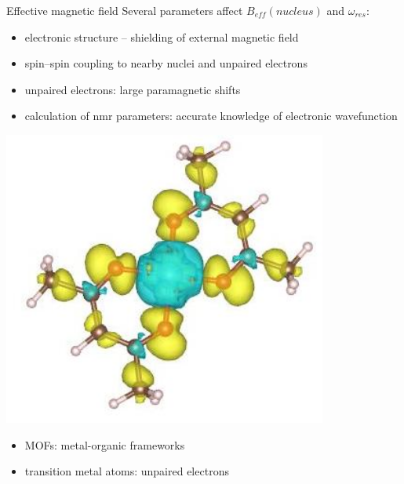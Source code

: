 \documentclass[slovene, usenames,dvipsnames]{beamer}
\begin{document}
\begin{frame}{Effective magnetic field}
  Several parameters affect $B_{eff}(nucleus)$ and $\omega_{res}$: \pause
  \begin{itemize}[]
  \item electronic structure -- shielding of external magnetic field \pause 
  \item spin--spin coupling to nearby nuclei and unpaired electrons \pause
  \item unpaired electrons: large paramagnetic shifts \pause
    \item calculation of nmr parameters: accurate knowledge of electronic wavefunction
   \end{itemize}
 \begin{minipage}[]{0.4\textwidth}
      \centering
    \includegraphics[width=0.8\textwidth]{cuacac_spin_density.png}
 \end{minipage}%
 \begin{minipage}[]{0.6\textwidth}
   \centering
    \begin{itemize}[]
    \item MOFs: metal-organic frameworks \pause
    \item transition metal atoms: unpaired electrons \pause
   \end{itemize}
 \end{minipage}
\end{frame}
\end{document}
